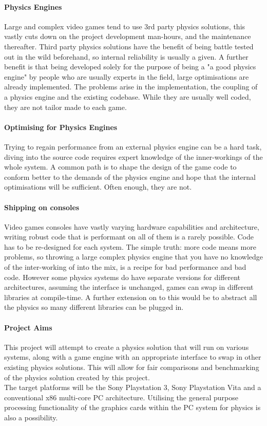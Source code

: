 \documentclass[conference]{acmsiggraph}
\begin{document}
\paragraph{Physics Engines}
Large and complex video games tend to use 3rd party physics solutions, this vastly cuts down on the project development man-hours, and the maintenance thereafter. Third party physics solutions have the benefit of being battle tested out in the wild beforehand, so internal reliability is usually a given. A further benefit is that being developed solely for the purpose of being a "a good physics engine" by people who are usually experts in the field, large optimisations are already implemented. The problems arise in the implementation, the coupling of a physics engine and the existing codebase. While they are usually well coded, they are not tailor made to each game. 

\paragraph{Optimising for Physics Engines}
Trying to regain performance from an external physics engine can be a hard task, diving into the source code requires expert knowledge of the inner-workings of the whole system. A common path is to shape the design of the game code to conform better to the demands of the physics engine and hope that the internal optimisations  will be sufficient. Often enough, they are not.

\paragraph{Shipping on consoles}
Video games consoles have vastly varying hardware capabilities and architecture, writing robust code that is performant on all of them is a rarely possible. Code has to be re-designed for each system. The simple truth: more code means more problems, so throwing a large complex physics engine that you have no knowledge of the inter-working of into the mix, is a recipe for bad performance and bad code. However some physics systems do have separate versions for different architectures, assuming the interface is unchanged, games can swap in different libraries at compile-time. A further extension on to this would be to abstract all the physics so many different libraries can be plugged in.

\paragraph{Project Aims}
This project will attempt to create a physics solution that will run on various systems, along with a game engine with an appropriate interface to swap in other existing physics solutions. This will allow for fair comparisons and benchmarking of the physics solution created by this project.\\
The target platforms will be the Sony Playstation 3, Sony Playstation Vita and a conventional x86 multi-core PC architecture.
Utilising the general purpose processing functionality of the graphics cards within the PC system for physics is also a possibility.
\end{document}
